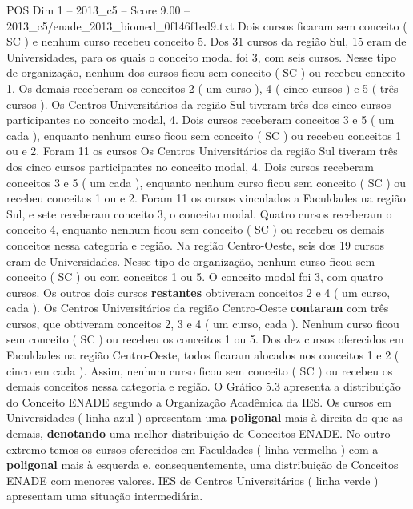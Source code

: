 \begin{textsample}{POS Dim 1 – 2013\_c5 – Score 9.00 – 2013\_c5/enade\_2013\_biomed\_0f146f1ed9.txt}
Dois cursos ficaram sem conceito ( SC ) e nenhum curso recebeu conceito 5.
Dos 31 cursos da região Sul, 15 eram de Universidades, para os quais o conceito modal foi 3, com seis cursos.
Nesse tipo de organização, nenhum dos cursos ficou sem conceito ( SC ) ou recebeu conceito 1.
Os demais receberam os conceitos 2 ( um curso ), 4 ( cinco cursos ) e 5 ( três cursos ).
Os Centros Universitários da região Sul tiveram três dos cinco cursos participantes no conceito modal, 4.
Dois cursos receberam conceitos 3 e 5 ( um cada ), enquanto nenhum curso ficou sem conceito ( SC ) ou recebeu conceitos 1 ou e 2.
Foram 11 os cursos Os Centros Universitários da região Sul tiveram três dos cinco cursos participantes no conceito modal, 4.
Dois cursos receberam conceitos 3 e 5 ( um cada ), enquanto nenhum curso ficou sem conceito ( SC ) ou recebeu conceitos 1 ou e 2.
Foram 11 os cursos vinculados a Faculdades na região Sul, e sete receberam conceito 3, o conceito modal.
Quatro cursos receberam o conceito 4, enquanto nenhum ficou sem conceito ( SC ) ou recebeu os demais conceitos nessa categoria e região.
Na região Centro-Oeste, seis dos 19 cursos eram de Universidades.
Nesse tipo de organização, nenhum curso ficou sem conceito ( SC ) ou com conceitos 1 ou 5.
O conceito modal foi 3, com quatro cursos.
Os outros dois cursos \textbf{restantes} obtiveram conceitos 2 e 4 ( um curso, cada ).
Os Centros Universitários da região Centro-Oeste \textbf{contaram} com três cursos, que obtiveram conceitos 2, 3 e 4 ( um curso, cada ).
Nenhum curso ficou sem conceito ( SC ) ou recebeu os conceitos 1 ou 5.
Dos dez cursos oferecidos em Faculdades na região Centro-Oeste, todos ficaram alocados nos conceitos 1 e 2 ( cinco em cada ).
Assim, nenhum curso ficou sem conceito ( SC ) ou recebeu os demais conceitos nessa categoria e região.
O Gráfico 5.3 apresenta a distribuição do Conceito ENADE segundo a Organização Acadêmica da IES.
Os cursos em Universidades ( linha azul ) apresentam uma \textbf{poligonal} mais à direita do que as demais, \textbf{denotando} uma melhor distribuição de Conceitos ENADE.
No outro extremo temos os cursos oferecidos em Faculdades ( linha vermelha ) com a \textbf{poligonal} mais à esquerda e, consequentemente, uma distribuição de Conceitos ENADE com menores valores.
IES de Centros Universitários ( linha verde ) apresentam uma situação intermediária.

\end{textsample}
